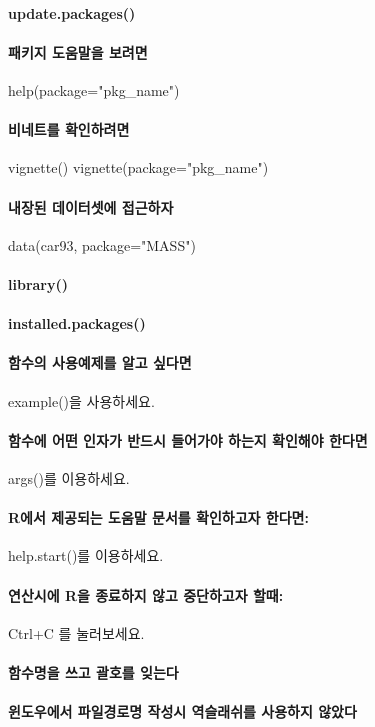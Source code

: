 \paragraph{update.packages()}
\paragraph{패키지 도움말을 보려면 } help(package="pkg_{name}")
\paragraph{비네트를 확인하려면 }  
vignette()
vignette(package="pkg_{name}")
\paragraph{내장된 데이터셋에 접근하자} data(car93, package="MASS")
\paragraph{library()}
\paragraph{installed.packages()}
\paragraph{함수의 사용예제를 알고 싶다면 } example()을 사용하세요. 
\paragraph{함수에 어떤 인자가 반드시 들어가야 하는지 확인해야 한다면}  args()를 이용하세요.
\paragraph{R에서 제공되는 도움말 문서를 확인하고자 한다면:} help.start()를 이용하세요.
\paragraph{연산시에 R을 종료하지 않고 중단하고자 할때:}  Ctrl+C 를 눌러보세요.
\paragraph{함수명을 쓰고 괄호를 잊는다}
\paragraph{윈도우에서 파일경로명 작성시 역슬래쉬를 사용하지 않았다}
